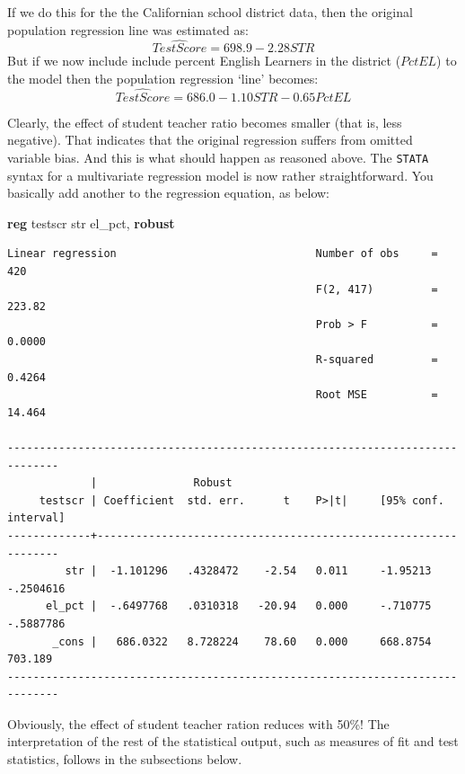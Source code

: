 \documentclass[
]{book}
\newenvironment{Shaded}{\begin{snugshade}}{\end{snugshade}}
\newcommand{\KeywordTok}[1]{\textcolor[rgb]{0.13,0.29,0.53}{\textbf{#1}}}
\newcommand{\NormalTok}[1]{#1}
\begin{document}
If we do this for the the Californian school district data, then the original population regression line was estimated as:
\begin{equation}
\widehat{TestScore} = 698.9- 2.28 STR
\end{equation}
But if we now include include percent English Learners in the district (\(PctEL\)) to the model then the population regression `line' becomes:
\begin{equation}
\widehat{TestScore} = 686.0- 1.10 STR - 0.65  PctEL
\end{equation}

Clearly, the effect of student teacher ratio becomes smaller (that is, less negative). That indicates that the original regression suffers from omitted variable bias. And this is what should happen as reasoned above. The \texttt{STATA} syntax for a multivariate regression model is now rather straightforward. You basically add another to the regression equation, as below:

\begin{Shaded}
\begin{Highlighting}[]
\KeywordTok{reg}\NormalTok{ testscr str el\_pct, }\KeywordTok{robust}
\end{Highlighting}
\end{Shaded}

\begin{verbatim}
Linear regression                               Number of obs     =        420
                                                F(2, 417)         =     223.82
                                                Prob > F          =     0.0000
                                                R-squared         =     0.4264
                                                Root MSE          =     14.464

------------------------------------------------------------------------------
             |               Robust
     testscr | Coefficient  std. err.      t    P>|t|     [95% conf. interval]
-------------+----------------------------------------------------------------
         str |  -1.101296   .4328472    -2.54   0.011     -1.95213   -.2504616
      el_pct |  -.6497768   .0310318   -20.94   0.000     -.710775   -.5887786
       _cons |   686.0322   8.728224    78.60   0.000     668.8754     703.189
------------------------------------------------------------------------------
\end{verbatim}

Obviously, the effect of student teacher ration reduces with 50\%! The interpretation of the rest of the statistical output, such as measures of fit and test statistics, follows in the subsections below.
\end{document}

